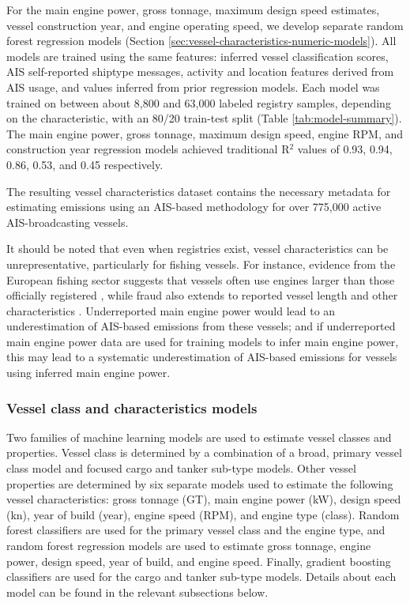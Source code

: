 \documentclass[lineno,pdflatex,sn-nature]{sn-jnl}
\begin{document}
For the main engine power, gross tonnage, maximum design speed estimates, vessel construction year, and engine operating speed, we develop separate random forest regression models (Section \ref{sec:vessel-characteristics-numeric-models}). All models are trained using the same features: inferred vessel classification scores, AIS self-reported shiptype messages, activity and location features derived from AIS usage, and values inferred from prior regression models. Each model was trained on between about 8,800 and 63,000 labeled registry samples, depending on the characteristic, with an 80/20 train-test split (Table \ref{tab:model-summary}). The main engine power, gross tonnage, maximum design speed, engine RPM, and construction year regression models achieved traditional R$^{2}$ values of 0.93, 0.94, 0.86, 0.53, and 0.45 respectively.

The resulting vessel characteristics dataset contains the necessary metadata for estimating emissions using an AIS-based methodology for over 775,000 active AIS-broadcasting vessels.

It should be noted that even when registries exist, vessel characteristics can be unrepresentative, particularly for fishing vessels. For instance, evidence from the European fishing sector suggests that vessels often use engines larger than those officially registered \cite{EC_EnginePower_2019}, while fraud also extends to reported vessel length and other characteristics \cite{ECA_FisheriesControl_2017}. Underreported main engine power would lead to an underestimation of AIS-based emissions from these vessels; and if underreported main engine power data are used for training models to infer main engine power, this may lead to a systematic underestimation of AIS-based emissions for vessels using inferred main engine power.

\subsubsection{Vessel class and characteristics models}\label{sec:vessel-characteristics-models}

Two families of machine learning models are used to estimate vessel classes and properties. Vessel class is determined by a combination of a broad, primary vessel class model and focused cargo and tanker sub-type models. Other vessel properties are determined by six separate models used to estimate the following vessel characteristics: gross tonnage (GT), main engine power (kW), design speed (kn), year of build (year), engine speed (RPM), and engine type (class). Random forest classifiers are used for the primary vessel class and the engine type, and random forest regression models are used to estimate gross tonnage, engine power, design speed, year of build, and engine speed. Finally, gradient boosting classifiers are used for the cargo and tanker sub-type models. Details about each model can be found in the relevant subsections below.
\end{document}
